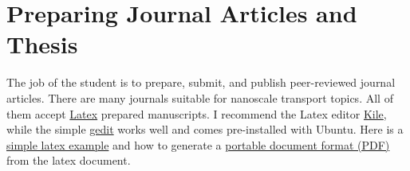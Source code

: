 %
%
%
%
%
%
%
%
%

\section{Preparing Journal Articles and Thesis}

The job of the student is to prepare, submit, and publish 
peer-reviewed journal articles. There are many journals suitable for 
nanoscale transport topics. All of them accept 
\href{http://www.latex-project.org/}{Latex} prepared manuscripts. 
I recommend the Latex editor 
\href{http://kile.sourceforge.net/}{Kile}, while the simple 
\href{https://projects.gnome.org/gedit/}{gedit} works well and comes 
pre-installed with Ubuntu. Here is a 
\href{http://mally.stanford.edu/~sr/computing/latex-example.html}
{simple latex example} and how to generate a 
\href{http://tex.stackexchange.com/questions/1596/how-to-compile-a-latex-document}
{portable document format (PDF)} from the latex document.  

